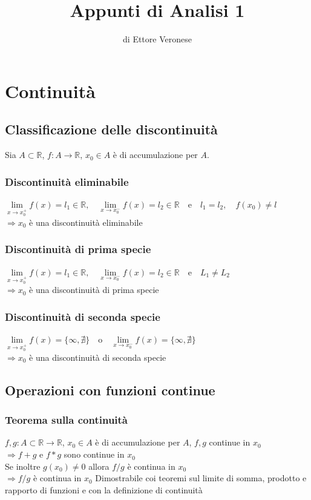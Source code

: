 \documentclass{article}
\title{Appunti di Analisi 1}
\author{di Ettore Veronese}
\begin{document}
\maketitle

\section{Continuità}
\subsection{Classificazione delle discontinuità}
Sia $A \subset \mathbb{R}$, $f : A \to \mathbb{R}$, $x_0\in A$ è di accumulazione per $A$.

\subsubsection{Discontinuità eliminabile}
$\lim\limits_{x \to x_0^+} f(x) = l_1 \in \mathbb{R}, \quad \lim\limits_{x \to x_0^-}f(x) = l_2 \in \mathbb{R} \quad$e$ \quad l_1=l_2, \quad f(x_0) \neq l$ \\
$\Rightarrow x_0$ è una discontinuità eliminabile

\subsubsection{Discontinuità di prima specie}
$\lim\limits_{x \to x_0^+} f(x) = l_1 \in \mathbb{R}, \quad \lim\limits_{x \to x_0^-} f(x) = l_2 \in \mathbb{R} \quad $e$ \quad L_1 \neq L_2$ \\
$\Rightarrow x_0$ è una discontinuità di prima specie

\subsubsection{Discontinuità di seconda specie}
$\lim\limits_{x \to x_0^+} f(x) = \{\infty,\nexists\} \quad $o$ \quad \lim\limits_{x \to x_0^-} f(x) = \{\infty,\nexists\}$ \\
$\Rightarrow x_0$ è una discontinuità di seconda specie

\subsection{Operazioni con funzioni continue}
\subsubsection{Teorema sulla continuità} 
$f,g: A \subset \mathbb{R} \to \mathbb{R}$, $x_0 \in A$ è di accumulazione per $A$, $f,g$ continue in $x_0$\\ 
$\Rightarrow f+g$ e $f*g$ sono continue in $x_0$\\
Se inoltre $g(x_0) \neq 0$ allora $f/g$ è continua in $x_0$\\ 
$\Rightarrow f/g$ è continua in $x_0$
\bigbreak
\noindent Dimostrabile coi teoremi sul limite di somma, prodotto e rapporto di funzioni e con la definizione di continuità
\end{document}

